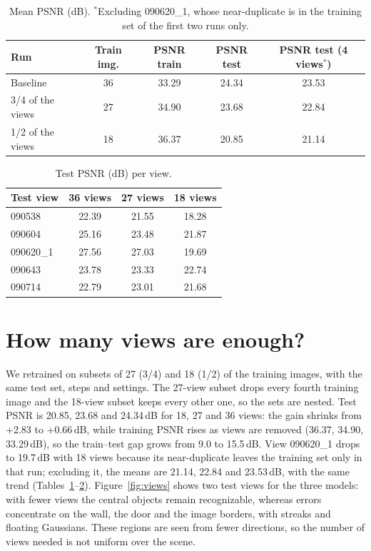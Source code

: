 \documentclass[11pt]{article}
\begin{document}
\begin{table}[H]
\centering
\begin{tabular}{lcccc}
\toprule
Run & Train img. & PSNR train & PSNR test & PSNR test (4 views$^*$) \\
\midrule
Baseline & 36 & 33.29 & 24.34 & 23.53 \\
3/4 of the views & 27 & 34.90 & 23.68 & 22.84 \\
1/2 of the views & 18 & 36.37 & 20.85 & 21.14 \\
\bottomrule
\end{tabular}
\caption{Mean PSNR (dB). $^*$Excluding 090620\_1, whose near-duplicate is in the training set
of the first two runs only.}
\label{tab:psnr}
\end{table}

\begin{table}[H]
\centering
\begin{tabular}{lccc}
\toprule
Test view & 36 views & 27 views & 18 views \\
\midrule
090538 & 22.39 & 21.55 & 18.28 \\
090604 & 25.16 & 23.48 & 21.87 \\
090620\_1 & 27.56 & 27.03 & 19.69 \\
090643 & 23.78 & 23.33 & 22.74 \\
090714 & 22.79 & 23.01 & 21.68 \\
\bottomrule
\end{tabular}
\caption{Test PSNR (dB) per view.}
\label{tab:perview}
\end{table}

\section{How many views are enough?}
We retrained on subsets of 27 (3/4) and 18 (1/2) of the training images, with the same
test set, steps and settings. The 27-view subset drops every fourth training image and the
18-view subset keeps every other one, so the sets are nested. Test PSNR is 20.85, 23.68 and
24.34\,dB for 18, 27 and 36 views:
the gain shrinks from +2.83 to +0.66\,dB, while training PSNR rises as views are removed
(36.37, 34.90, 33.29\,dB), so the train--test gap grows from 9.0 to 15.5\,dB. View 090620\_1
drops to 19.7\,dB with 18 views because its near-duplicate leaves the training set only in that
run; excluding it, the means are 21.14, 22.84 and 23.53\,dB, with the same trend
(Tables~\ref{tab:psnr}--\ref{tab:perview}). Figure~\ref{fig:views} shows two test views for the
three models: with fewer views the central objects remain recognizable, whereas errors
concentrate on the wall, the door and the image borders, with streaks and floating Gaussians.
These regions are seen from fewer directions, so the number of views needed is not uniform
over the scene.
\end{document}
